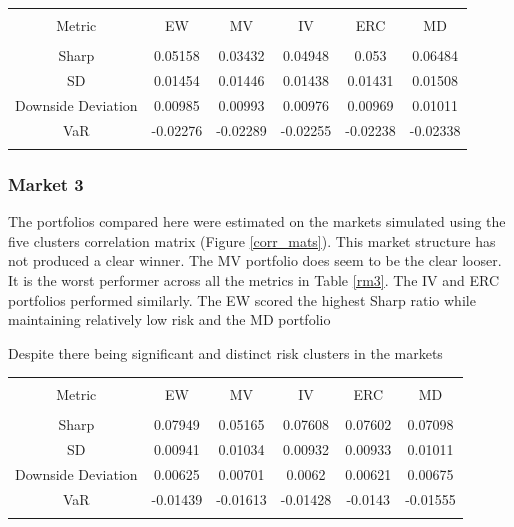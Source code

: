 \documentclass[11pt,preprint, authoryear]{elsarticle}
\let\origtable\table
\let\endorigtable\endtable
\renewenvironment{table}[1][2] {
    \expandafter\origtable\expandafter[H]
} {
    \endorigtable
}
\numberwithin{equation}{section}
\numberwithin{figure}{section}
\numberwithin{table}{section}
\begin{document}
\begin{table}[!htbp] \centering 
  \caption{Market 2 - Portfolio Risk Metrics} 
  \label{rm2} 
\begin{tabular}{@{\extracolsep{5pt}} cccccc} 
\\[-1.8ex]\hline 
\hline \\[-1.8ex] 
Metric & EW & MV & IV & ERC & MD \\ 
\hline \\[-1.8ex] 
Sharp & 0.05158 & 0.03432 & 0.04948 & 0.053 & 0.06484 \\ 
SD & 0.01454 & 0.01446 & 0.01438 & 0.01431 & 0.01508 \\ 
Downside Deviation & 0.00985 & 0.00993 & 0.00976 & 0.00969 & 0.01011 \\ 
VaR & -0.02276 & -0.02289 & -0.02255 & -0.02238 & -0.02338 \\ 
\hline \\[-1.8ex] 
\end{tabular} 
\end{table}

\hypertarget{market-3}{%
\subsubsection{Market 3}\label{market-3}}

The portfolios compared here were estimated on the markets simulated
using the five clusters correlation matrix (Figure \ref{corr_mats}).
This market structure has not produced a clear winner. The MV portfolio
does seem to be the clear looser. It is the worst performer across all
the metrics in Table \ref{rm3}. The IV and ERC portfolios performed
similarly. The EW scored the highest Sharp ratio while maintaining
relatively low risk and the MD portfolio

Despite there being significant and distinct risk clusters in the
markets

\begin{table}[!htbp] \centering 
  \caption{Market 3 Risk Metrics} 
  \label{rm3} 
\begin{tabular}{@{\extracolsep{5pt}} cccccc} 
\\[-1.8ex]\hline 
\hline \\[-1.8ex] 
Metric & EW & MV & IV & ERC & MD \\ 
\hline \\[-1.8ex] 
Sharp & 0.07949 & 0.05165 & 0.07608 & 0.07602 & 0.07098 \\ 
SD & 0.00941 & 0.01034 & 0.00932 & 0.00933 & 0.01011 \\ 
Downside Deviation & 0.00625 & 0.00701 & 0.0062 & 0.00621 & 0.00675 \\ 
VaR & -0.01439 & -0.01613 & -0.01428 & -0.0143 & -0.01555 \\ 
\hline \\[-1.8ex] 
\end{tabular} 
\end{table}
\end{document}
